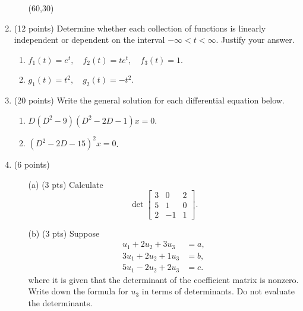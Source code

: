 \documentclass[12pt]{article}
\begin{document}
\begin{enumerate}
\begin{enumerate}
            \hfill \framebox(60,30){}

            
\end{enumerate}
    
\newpage
  

  \item (12 points) Determine whether each collection of functions is linearly
    independent or dependent on the interval $-\infty < t < \infty$.
    Justify your answer.
    \begin{enumerate}
    \item $f_1(t) = e^t, \quad f_2(t) = t e^t, \quad f_3(t) = 1$.
    \item $g_1(t) = t^2, \quad g_2(t) = - t^2$.
      \end{enumerate}


\item (20 points)  Write the general solution for each differential
  equation below.
  \begin{enumerate}
  \item $D(D^2 -9) (D^2 -2D-1) x = 0$.
  \item $(D^2 -2D -15)^2 x = 0$.
  \end{enumerate}


\item (6 points)
\begin{enumerate}
\item[(a)]  (3 pts)  Calculate
  \[
    \det \begin{bmatrix}
      3 & 0 &2 \\
      5 & 1 & 0 \\
      2 & -1 & 1
    \end{bmatrix}.
    \]

      \item[(b)] (3 pts) Suppose
          \begin{align*}
            u_1 + 2 u_2 + 3 u_3 &= a,\\
            3u_1 + 2 u_2 + 1 u_3 &= b,\\
            5 u_1 - 2 u_2 + 2 u_3 &= c.
          \end{align*}
          where it is given that the determinant of the coefficient matrix is nonzero.
          Write down the formula for $u_3$ in terms of determinants.
          Do not evaluate the determinants.



\end{enumerate}
\end{enumerate}
\end{document}
